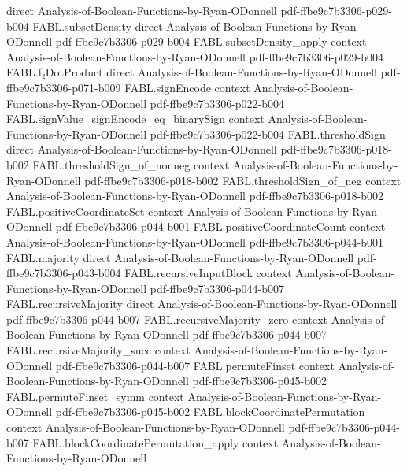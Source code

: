 \begin{theorem}
  {direct}
  {Analysis-of-Boolean-Functions-by-Ryan-ODonnell}
  {pdf-ffbe9c7b3306-p029-b004}
\proofstep
  {FABL.subsetDensity}
  {direct}
  {Analysis-of-Boolean-Functions-by-Ryan-ODonnell}
  {pdf-ffbe9c7b3306-p029-b004}
\proofstep
  {FABL.subsetDensity_apply}
  {context}
  {Analysis-of-Boolean-Functions-by-Ryan-ODonnell}
  {pdf-ffbe9c7b3306-p029-b004}
\proofstep
  {FABL.f₂DotProduct}
  {direct}
  {Analysis-of-Boolean-Functions-by-Ryan-ODonnell}
  {pdf-ffbe9c7b3306-p071-b009}
\proofstep
  {FABL.signEncode}
  {context}
  {Analysis-of-Boolean-Functions-by-Ryan-ODonnell}
  {pdf-ffbe9c7b3306-p022-b004}
\proofstep
  {FABL.signValue_signEncode_eq_binarySign}
  {context}
  {Analysis-of-Boolean-Functions-by-Ryan-ODonnell}
  {pdf-ffbe9c7b3306-p022-b004}
\proofstep
  {FABL.thresholdSign}
  {direct}
  {Analysis-of-Boolean-Functions-by-Ryan-ODonnell}
  {pdf-ffbe9c7b3306-p018-b002}
\proofstep
  {FABL.thresholdSign_of_nonneg}
  {context}
  {Analysis-of-Boolean-Functions-by-Ryan-ODonnell}
  {pdf-ffbe9c7b3306-p018-b002}
\proofstep
  {FABL.thresholdSign_of_neg}
  {context}
  {Analysis-of-Boolean-Functions-by-Ryan-ODonnell}
  {pdf-ffbe9c7b3306-p018-b002}
\proofstep
  {FABL.positiveCoordinateSet}
  {context}
  {Analysis-of-Boolean-Functions-by-Ryan-ODonnell}
  {pdf-ffbe9c7b3306-p044-b001}
\proofstep
  {FABL.positiveCoordinateCount}
  {context}
  {Analysis-of-Boolean-Functions-by-Ryan-ODonnell}
  {pdf-ffbe9c7b3306-p044-b001}
\proofstep
  {FABL.majority}
  {direct}
  {Analysis-of-Boolean-Functions-by-Ryan-ODonnell}
  {pdf-ffbe9c7b3306-p043-b004}
\proofstep
  {FABL.recursiveInputBlock}
  {context}
  {Analysis-of-Boolean-Functions-by-Ryan-ODonnell}
  {pdf-ffbe9c7b3306-p044-b007}
\proofstep
  {FABL.recursiveMajority}
  {direct}
  {Analysis-of-Boolean-Functions-by-Ryan-ODonnell}
  {pdf-ffbe9c7b3306-p044-b007}
\proofstep
  {FABL.recursiveMajority_zero}
  {context}
  {Analysis-of-Boolean-Functions-by-Ryan-ODonnell}
  {pdf-ffbe9c7b3306-p044-b007}
\proofstep
  {FABL.recursiveMajority_succ}
  {context}
  {Analysis-of-Boolean-Functions-by-Ryan-ODonnell}
  {pdf-ffbe9c7b3306-p044-b007}
\proofstep
  {FABL.permuteFinset}
  {context}
  {Analysis-of-Boolean-Functions-by-Ryan-ODonnell}
  {pdf-ffbe9c7b3306-p045-b002}
\proofstep
  {FABL.permuteFinset_symm}
  {context}
  {Analysis-of-Boolean-Functions-by-Ryan-ODonnell}
  {pdf-ffbe9c7b3306-p045-b002}
\proofstep
  {FABL.blockCoordinatePermutation}
  {context}
  {Analysis-of-Boolean-Functions-by-Ryan-ODonnell}
  {pdf-ffbe9c7b3306-p044-b007}
\proofstep
  {FABL.blockCoordinatePermutation_apply}
  {context}
  {Analysis-of-Boolean-Functions-by-Ryan-ODonnell}

\end{theorem}
